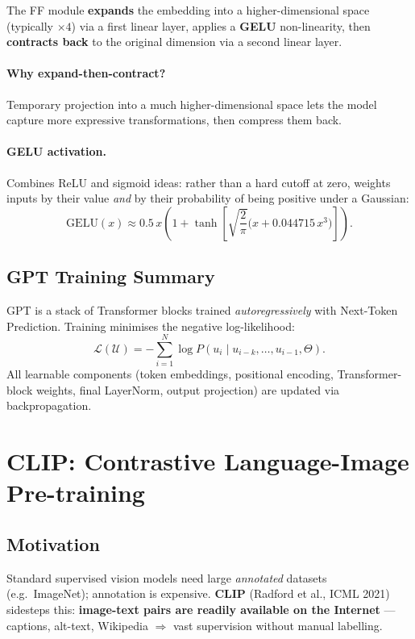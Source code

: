 \documentclass[11pt,a4paper]{article}
\theoremstyle{definition}
\theoremstyle{plain}
\theoremstyle{remark}
\begin{document}
The FF module \textbf{expands} the embedding into a higher-dimensional space (typically $\times 4$) via a first linear layer, applies a \textbf{GELU} non-linearity, then \textbf{contracts back} to the original dimension via a second linear layer.

\paragraph{Why expand-then-contract?} Temporary projection into a much higher-dimensional space lets the model capture more expressive transformations, then compress them back.

\paragraph{GELU activation.} Combines ReLU and sigmoid ideas: rather than a hard cutoff at zero, weights inputs by their value \emph{and} by their probability of being positive under a Gaussian:
\[
    \mathrm{GELU}(x) \approx 0.5\, x \left(1 + \tanh\!\left[\sqrt{\frac{2}{\pi}}\bigl(x + 0.044715\, x^3\bigr)\right]\right).
\]

\subsection{GPT Training Summary}

GPT is a stack of Transformer blocks trained \emph{autoregressively} with Next-Token Prediction. Training minimises the negative log-likelihood:
\[
    \mathcal{L}(\mathcal{U}) = -\sum_{i=1}^{N} \log P(u_i \mid u_{i-k}, \ldots, u_{i-1}, \Theta).
\]
All learnable components (token embeddings, positional encoding, Transformer-block weights, final LayerNorm, output projection) are updated via backpropagation.


\section{CLIP: Contrastive Language-Image Pre-training}

\subsection{Motivation}

Standard supervised vision models need large \emph{annotated} datasets (e.g.\ ImageNet); annotation is expensive. \textbf{CLIP} (Radford et al., ICML 2021) sidesteps this: \textbf{image-text pairs are readily available on the Internet} --- captions, alt-text, Wikipedia $\Rightarrow$ vast supervision without manual labelling.
\end{document}
